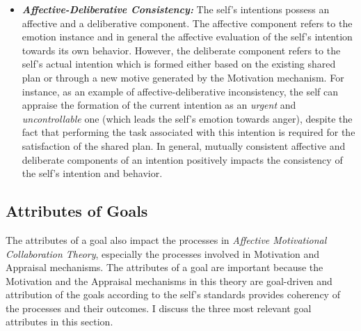 \documentclass[12pt]{report}
\begin{document}
\begin{itemize}
  \item \textbf{\textit{Affective-Deliberative Consistency:}} The self's
  intentions possess an affective and a deliberative component. The affective
  component refers to the emotion instance and in general the affective
  evaluation of the self's intention towards its own behavior. However, the
  deliberate component refers to the self's actual intention which is formed
  either based on the existing shared plan or through a new motive generated by
  the Motivation mechanism. For instance, as an example of
  affective-deliberative inconsistency, the self can appraise the formation of
  the current intention as an \textit{urgent} and \textit{uncontrollable} one
  (which leads the self's emotion towards anger), despite the fact that
  performing the task associated with this intention is required for the
  satisfaction of the shared plan. In general, mutually consistent affective and
  deliberate components of an intention positively impacts the consistency of
  the self's intention and behavior.
\end{itemize}

\subsection{Attributes of Goals}
\label{section-goal-attributes}

The attributes of a goal also impact the processes in \textit{Affective
Motivational Collaboration Theory}, especially the processes involved in
Motivation and Appraisal mechanisms. The attributes of a goal are important
because the Motivation and the Appraisal mechanisms in this theory are
goal-driven and attribution of the goals according to the self's standards
provides coherency of the processes and their outcomes. I discuss the three most
relevant goal attributes in this section.
\end{document}
